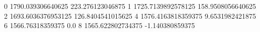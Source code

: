 0 1790.039306640625 223.276123046875
1 1725.7139892578125 158.9508056640625
2 1693.6036376953125 126.8404541015625
4 1576.4163818359375 9.6531982421875
6 1566.76318359375 0.0
8 1565.622802734375 -1.140380859375
